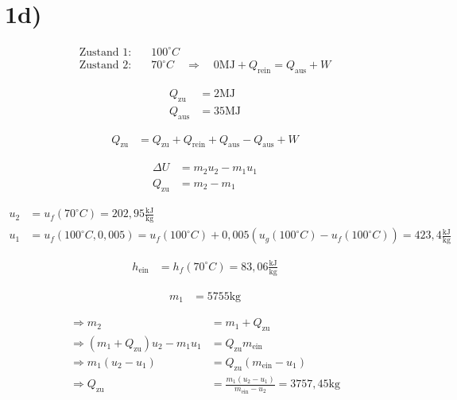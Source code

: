 

\section*{1d)}

\begin{align*}
\text{Zustand 1:} & \quad 100^\circ C \\
\text{Zustand 2:} & \quad 70^\circ C \quad \Rightarrow \quad 0 \text{MJ} + Q_{\text{rein}} = Q_{\text{aus}} + W
\end{align*}

\begin{align*}
Q_{\text{zu}} &= 2 \text{MJ} \\
Q_{\text{aus}} &= 35 \text{MJ}
\end{align*}

\begin{align*}
Q_{\text{zu}} &= Q_{\text{zu}} + Q_{\text{rein}} + Q_{\text{aus}} - Q_{\text{aus}} + W
\end{align*}

\begin{align*}
\Delta U &= m_2 u_2 - m_1 u_1 \\
Q_{\text{zu}} &= m_2 - m_1
\end{align*}

\begin{align*}
u_2 &= u_f(70^\circ C) = 202,95 \frac{\text{kJ}}{\text{kg}} \\
u_1 &= u_f(100^\circ C, 0,005) = u_f(100^\circ C) + 0,005 (u_g(100^\circ C) - u_f(100^\circ C)) = 423,4 \frac{\text{kJ}}{\text{kg}}
\end{align*}

\begin{align*}
h_{\text{ein}} &= h_f(70^\circ C) = 83,06 \frac{\text{kJ}}{\text{kg}}
\end{align*}

\begin{align*}
m_1 &= 5755 \text{kg}
\end{align*}

\begin{align*}
\Rightarrow m_2 &= m_1 + Q_{\text{zu}} \\
\Rightarrow (m_1 + Q_{\text{zu}}) u_2 - m_1 u_1 &= Q_{\text{zu}} m_{\text{ein}} \\
\Rightarrow m_1 (u_2 - u_1) &= Q_{\text{zu}} (m_{\text{ein}} - u_1) \\
\Rightarrow Q_{\text{zu}} &= \frac{m_1 (u_2 - u_1)}{m_{\text{ein}} - u_2} = 3757,45 \text{kg}
\end{align*}